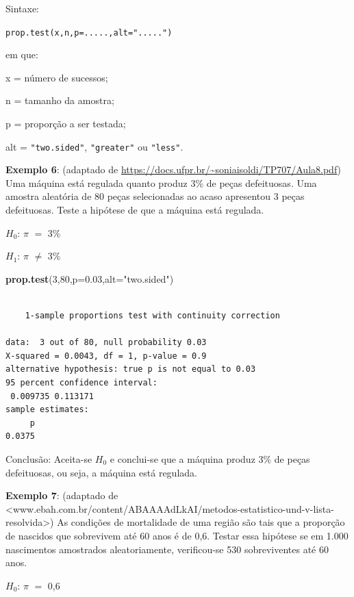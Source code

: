 \documentclass[12pt,brazil,oneside]{book}
\newenvironment{Shaded}{\begin{snugshade}}{\end{snugshade}}
\newcommand{\DataTypeTok}[1]{\textcolor[rgb]{0.13,0.29,0.53}{#1}}
\newcommand{\DecValTok}[1]{\textcolor[rgb]{0.00,0.00,0.81}{#1}}
\newcommand{\FloatTok}[1]{\textcolor[rgb]{0.00,0.00,0.81}{#1}}
\newcommand{\KeywordTok}[1]{\textcolor[rgb]{0.13,0.29,0.53}{\textbf{#1}}}
\newcommand{\NormalTok}[1]{#1}
\newcommand{\StringTok}[1]{\textcolor[rgb]{0.31,0.60,0.02}{#1}}
\begin{document}
Sintaxe:

\texttt{prop.test(x,n,p=.....,alt=".....")}

em que:

x = número de sucessos;

n = tamanho da amostra;

p = proporção a ser testada;

alt = \texttt{"two.sided"}, \texttt{"greater"} ou \texttt{"less"}.

\textbf{Exemplo 6}: (adaptado de \url{https://docs.ufpr.br/~soniaisoldi/TP707/Aula8.pdf}) Uma máquina está regulada quanto produz 3\% de peças defeituosas. Uma amostra aleatória de 80 peças selecionadas ao acaso apresentou 3 peças defeituosas. Teste a hipótese de que a máquina está regulada.

\textbf{\(H_0\)}: \(\pi\) \(=\) 3\%

\textbf{\(H_1\)}: \(\pi\) \(\neq\) 3\%

\begin{Shaded}
\begin{Highlighting}[]
\KeywordTok{prop.test}\NormalTok{(}\DecValTok{3}\NormalTok{,}\DecValTok{80}\NormalTok{,}\DataTypeTok{p=}\FloatTok{0.03}\NormalTok{,}\DataTypeTok{alt=}\StringTok{"two.sided"}\NormalTok{)}
\end{Highlighting}
\end{Shaded}

\begin{verbatim}

    1-sample proportions test with continuity correction

data:  3 out of 80, null probability 0.03
X-squared = 0.0043, df = 1, p-value = 0.9
alternative hypothesis: true p is not equal to 0.03
95 percent confidence interval:
 0.009735 0.113171
sample estimates:
     p 
0.0375 
\end{verbatim}

Conclusão: Aceita-se \(H_0\) e conclui-se que a máquina produz 3\% de peças defeituosas, ou seja, a máquina está regulada.

\textbf{Exemplo 7}: (adaptado de \textless{}www.ebah.com.br/content/ABAAAAdLkAI/metodos-estatistico-und-v-lista-resolvida\textgreater{}) As condições de mortalidade de uma região são tais que a proporção de nascidos que sobrevivem até 60 anos é de 0,6. Testar essa hipótese se em 1.000 nascimentos amostrados aleatoriamente, verificou-se 530 sobreviventes até 60 anos.

\textbf{\(H_0\)}: \(\pi\) \(=\) 0,6
\end{document}
